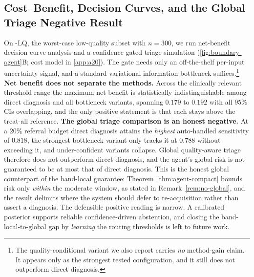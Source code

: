 \subsection{Cost--Benefit, Decision Curves, and the Global Triage Negative Result}
\label{sec:exp-triage}
\label{sec:exp-dca}%
On \itb{}-LQ, the worst-case low-quality subset with $n=300$, we run net-benefit
decision-curve analysis and a confidence-gated triage simulation
(\cref{fig:boundary-agent}B; cost model in \cref{app:a20}). The gate needs only an
off-the-shelf per-input uncertainty signal, and a standard variational information
bottleneck suffices.\footnote{The quality-conditional variant we also report carries
\emph{no} method-gain claim. It appears only as the strongest tested configuration, and it
still does not outperform direct diagnosis.} \textbf{Net benefit does not separate the
methods.} Across the clinically relevant threshold range the maximum net benefit is
statistically indistinguishable among direct diagnosis and all bottleneck variants, spanning
$0.179$ to $0.192$ with all $95\%$ CIs overlapping, and the only positive statement is that
each stays above the treat-all reference. \textbf{The global triage comparison is an honest
negative.} At a $20\%$ referral budget direct diagnosis attains the \emph{highest}
auto-handled sensitivity of $0.818$, the strongest bottleneck variant only tracks it at
$0.788$ without exceeding it, and under-confident variants collapse. Global quality-aware
triage therefore does not outperform direct diagnosis, and the agent's global risk is not
guaranteed to be at most that of direct diagnosis. This is the honest global counterpart of
the band-local guarantee: Theorem~\ref{thm:agent-compact} bounds risk only \emph{within} the
moderate window, as stated in Remark~\ref{rem:no-global}, and the result delimits where the
system should defer to re-acquisition rather than assert a diagnosis. The defensible positive
reading is narrow. A calibrated posterior supports reliable confidence-driven abstention, and
closing the band-local-to-global gap by \emph{learning} the routing thresholds is left to
future work.
